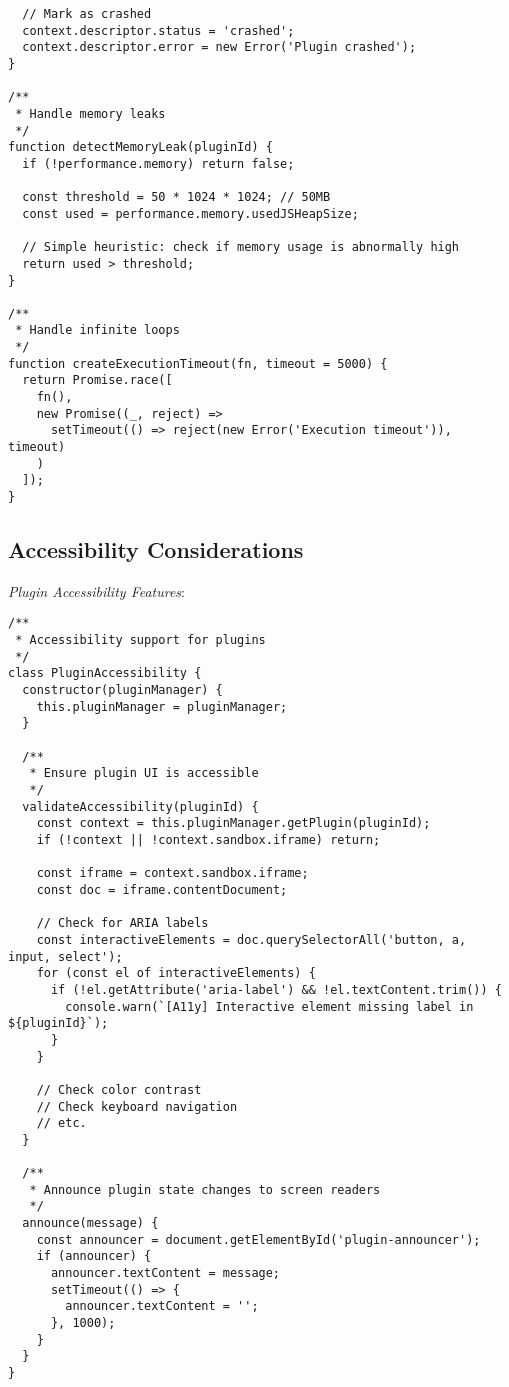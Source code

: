 \documentclass[11pt]{article}
\begin{document}
\begin{verbatim}
  // Mark as crashed
  context.descriptor.status = 'crashed';
  context.descriptor.error = new Error('Plugin crashed');
}

/**
 * Handle memory leaks
 */
function detectMemoryLeak(pluginId) {
  if (!performance.memory) return false;
  
  const threshold = 50 * 1024 * 1024; // 50MB
  const used = performance.memory.usedJSHeapSize;
  
  // Simple heuristic: check if memory usage is abnormally high
  return used > threshold;
}

/**
 * Handle infinite loops
 */
function createExecutionTimeout(fn, timeout = 5000) {
  return Promise.race([
    fn(),
    new Promise((_, reject) => 
      setTimeout(() => reject(new Error('Execution timeout')), timeout)
    )
  ]);
}
\end{verbatim}
\subsection{Accessibility Considerations}
\label{sec:org86957f3}

\emph{Plugin Accessibility Features}:

\begin{verbatim}
/**
 * Accessibility support for plugins
 */
class PluginAccessibility {
  constructor(pluginManager) {
    this.pluginManager = pluginManager;
  }
  
  /**
   * Ensure plugin UI is accessible
   */
  validateAccessibility(pluginId) {
    const context = this.pluginManager.getPlugin(pluginId);
    if (!context || !context.sandbox.iframe) return;
    
    const iframe = context.sandbox.iframe;
    const doc = iframe.contentDocument;
    
    // Check for ARIA labels
    const interactiveElements = doc.querySelectorAll('button, a, input, select');
    for (const el of interactiveElements) {
      if (!el.getAttribute('aria-label') && !el.textContent.trim()) {
        console.warn(`[A11y] Interactive element missing label in ${pluginId}`);
      }
    }
    
    // Check color contrast
    // Check keyboard navigation
    // etc.
  }
  
  /**
   * Announce plugin state changes to screen readers
   */
  announce(message) {
    const announcer = document.getElementById('plugin-announcer');
    if (announcer) {
      announcer.textContent = message;
      setTimeout(() => {
        announcer.textContent = '';
      }, 1000);
    }
  }
}
\end{verbatim}
\end{document}
